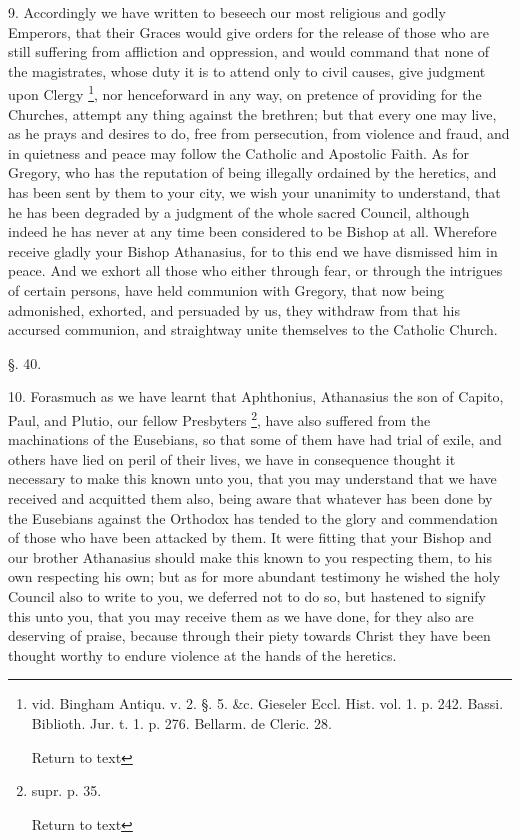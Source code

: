 9. Accordingly we have written to beseech our
most religious and godly Emperors, that their Graces would give orders
for the release of those who are still suffering from affliction and
oppression, and would command that none of the magistrates, whose
duty it is to attend only to civil causes, give judgment upon Clergy \footnote{vid. Bingham Antiqu. v. 2. §. 5. \&c.
Gieseler Eccl. Hist. vol. 1. p. 242. Bassi. Biblioth. Jur. t. 1. p.
276. Bellarm. de Cleric. 28.

Return to text}, nor henceforward in any way, on pretence of providing for
the Churches, attempt any thing against the brethren; but that every
one may live, as he prays and desires to do, free from persecution,
from violence and fraud, and in quietness and peace may follow the
Catholic and Apostolic Faith. As for Gregory, who has the reputation
of being illegally ordained by the heretics, and has been sent by them
to your city, we wish your unanimity to understand, that he has been
degraded by a judgment of the whole sacred Council, although indeed he
has never at any time been considered to be Bishop at all. Wherefore
receive gladly your Bishop Athanasius, for to this end we have
dismissed him in peace. And we exhort all those who either through
fear, or through the intrigues of certain persons, have held communion
with Gregory, that now being admonished, exhorted, and persuaded by
us, they withdraw from that his accursed communion, and straightway
unite themselves to the Catholic Church.

§. 40.

10. Forasmuch as we have learnt that Aphthonius,
Athanasius the son of Capito, Paul, and Plutio, our fellow Presbyters
\footnote{supr. p. 35.

Return to text}, have also suffered from the machinations of the Eusebians,
so that some of them have had trial of exile, and others have lied on
peril of their lives, we have in consequence thought it necessary to
make this known unto you, that you may understand that we have
received and acquitted them also, being aware that whatever has been
done by the Eusebians against the Orthodox has tended to the glory and
commendation of those who have been attacked by them. It were fitting
that your Bishop and our brother Athanasius should make this known to
you respecting them, to his own respecting his own; but as for more
abundant testimony he wished the holy Council also to write to you, we
deferred not to do so, but hastened to signify this unto you, that you
may receive them as we have done, for they also are deserving of
praise, because through their piety towards Christ they have been
thought worthy to endure violence at the hands of the heretics.

